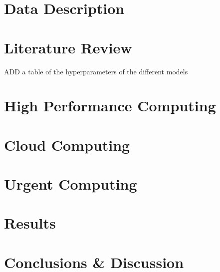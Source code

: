\documentclass[12pt, a4paper]{report}
\begin{document}
  \chapter{Data Description}
  
  \chapter{Literature Review}
  ADD a table of the hyperparameters of the different models
  
  \chapter{High Performance Computing}
  
  \chapter{Cloud Computing}
  
  \chapter{Urgent Computing}
  
  \chapter{Results}
  
  \chapter{Conclusions \& Discussion}
  
\end{document}
